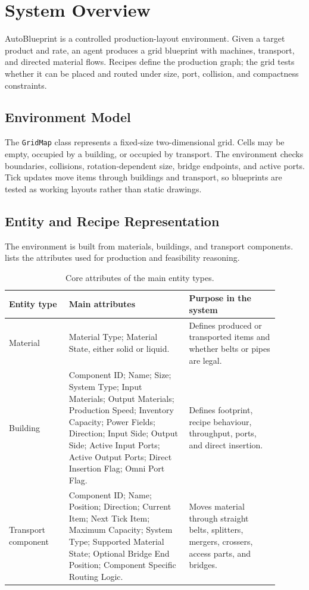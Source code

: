 \documentclass[11pt,a4paper]{article}
\begin{document}
\section{System Overview}
\label{sec:system}

AutoBlueprint is a controlled production-layout environment. Given a target product and rate, an agent produces a grid blueprint with machines, transport, and directed material flows. Recipes define the production graph; the grid tests whether it can be placed and routed under size, port, collision, and compactness constraints.

\subsection{Environment Model}

The \texttt{GridMap} class represents a fixed-size two-dimensional grid. Cells may be empty, occupied by a building, or occupied by transport. The environment checks boundaries, collisions, rotation-dependent size, bridge endpoints, and active ports. Tick updates move items through buildings and transport, so blueprints are tested as working layouts rather than static drawings.

\subsection{Entity and Recipe Representation}

The environment is built from materials, buildings, and transport components.  lists the attributes used for production and feasibility reasoning.

\begin{table}[H]
    \centering
    \caption{Core attributes of the main entity types.}
    \label{tab:entity-attributes}
    \begin{tabular}{L{0.20\linewidth} L{0.40\linewidth} L{0.30\linewidth}}
        \toprule
        Entity type & Main attributes & Purpose in the system \\
        \midrule
        Material &
        Material Type; Material State, either solid or liquid. &
        Defines produced or transported items and whether belts or pipes are legal. \\
        \addlinespace
        Building &
        Component ID; Name; Size; System Type; Input Materials; Output Materials; Production Speed; Inventory Capacity; Power Fields; Direction; Input Side; Output Side; Active Input Ports; Active Output Ports; Direct Insertion Flag; Omni Port Flag. &
        Defines footprint, recipe behaviour, throughput, ports, and direct insertion. \\
        \addlinespace
        Transport component &
        Component ID; Name; Position; Direction; Current Item; Next Tick Item; Maximum Capacity; System Type; Supported Material State; Optional Bridge End Position; Component Specific Routing Logic. &
        Moves material through straight belts, splitters, mergers, crossers, access parts, and bridges. \\
        \bottomrule
    \end{tabular}
\end{table}
\end{document}

